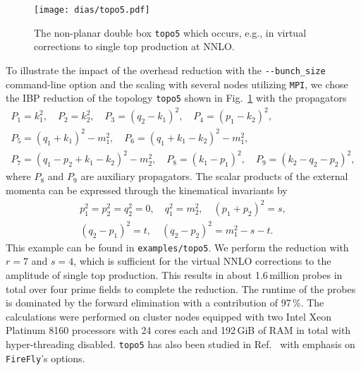 \documentclass[11pt,a4paper,DIV=11,numbers=noenddot,parskip=half]{scrartcl}
\newcommand{\code}[1]{\texttt{#1}}
\newcommand*{\firefly}{\code{FireFly}}
\begin{document}
%
\begin{figure}[ht]
  \centering
  \texttt{[image: dias/topo5.pdf]}
  \caption{The non-planar double box \code{topo5} which occurs, e.g., in virtual corrections to single top production at NNLO.}
  \label{fig:topo5}
\end{figure}
%
To illustrate the impact of the overhead reduction with the \code{-{}-bunch\_size} command-line option and the scaling with several nodes utilizing \code{MPI}, we chose the IBP reduction of the topology \code{topo5} shown in Fig.~\ref{fig:topo5} with the propagators
\begin{equation}
  \begin{gathered}
    P_1 = k_1^2,\quad
    P_2 = k_2^2,\quad
    P_3 = (q_2-k_1)^2,\quad
    P_4 = (p_1-k_2)^2,\\
    P_5 = (q_1+k_1)^2 - m_1^2,\quad
    P_6 = (q_1+k_1-k_2)^2 - m_1^2,\\
    P_7 = (q_1-p_2+k_1-k_2)^2 - m_2^2,\quad
    P_8 = (k_1-p_1)^2,\quad
    P_9 = (k_2-q_2-p_2)^2,
  \end{gathered}
  \label{eq:topo5_prop}
\end{equation}
where $P_8$ and $P_9$ are auxiliary propagators.
The scalar products of the external momenta can be expressed through the kinematical invariants by
\begin{equation}
  \begin{gathered}
    p_1^2 = p_2^2 = q_2^2 = 0, \quad q_1^2 = m_2^2, \quad (p_1+p_2)^2 = s,\\
    (q_2-p_1)^2 = t, \quad (q_2-p_2)^2 = m_1^2 - s - t.
  \end{gathered}
\end{equation}
This example can be found in \code{examples/topo5}.
We perform the reduction with $r = 7$ and $s = 4$, which is sufficient for the virtual NNLO corrections to the amplitude of single top production.
This results in about 1.6\,million probes in total over four prime fields to complete the reduction.
The runtime of the probes is dominated by the forward elimination with a contribution of 97\,\%.
The calculations were performed on cluster nodes equipped with two Intel Xeon Platinum 8160 processors with 24 cores each and 192\,GiB of RAM in total with hyper-threading disabled.
\code{topo5} has also been studied in Ref.~\cite{Klappert:2020aqs} with emphasis on \firefly{}'s options.
\end{document}
